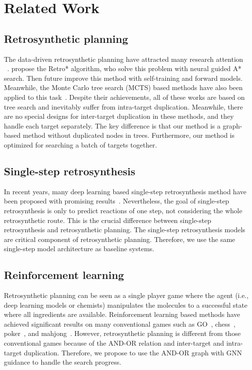 \documentclass[sigconf]{acmart}
\begin{document}
\section{Related Work}
\subsection{Retrosynthetic planning}
The data-driven retrosynthetic planning have attracted many research attention ~\cite{Chen2020,Kim2021,Dong2021,Finnigan2021,Jeong2021,segler2018planning,Schreck2019,Wang2020,Hong2021,han2022gnn}.
\citet{Chen2020} propose the Retro* algorithm, who solve this problem with neural guided A* search.
Then \citet{Kim2021} future improve this method with self-training and forward models.
Meanwhile, the Monte Carlo tree search (MCTS) based methods have also been applied to this task~\citep{segler2018planning,Schreck2019,Wang2020,Hong2021}.
Despite their achievements, all of these works are based on tree search and inevitably suffer from intra-target duplication.
Meanwhile, there are no special designs for inter-target duplication in these methods, and they handle each target separately.
The key difference is that our method is a graph-based method without duplicated nodes in trees.
Furthermore, our method is optimized for searching a batch of targets together.


\subsection{Single-step retrosynthesis}
In recent years, many deep learning based single-step retrosynthesis method have been proposed with promising results~\citep{segler2017towards,dai2020retrosynthesis,Chen2021,yan2020retroxpert,somnath2020learning,shi2020graph,yang2021}.
Nevertheless, the goal of single-step retrosynthesis is only to predict reactions of one step, not considering the whole retrosynthetic route.
This is the crucial difference between single-step retrosynthesis and retrosynthetic planning.
The single-step retrosynthesis models are critical component of retrosynthetic planning.
Therefore, we use the same single-step model architecture as baseline systems.

\subsection{Reinforcement learning}
Retrosynthetic planning can be seen as a single player game where the agent (i.e., deep learning models or chemists) manipulates the molecules to a successful state where all ingredients are available.
Reinforcement learning based methods have achieved significant results on many conventional games such as GO~\citep{silver2017mastering,alphazero}, chess~\citep{alphazero}, poker~\citep{poker2019}, and mahjong~\citep{li2020suphx}.
However, retrosynthetic planning is different from those conventional games because of the AND-OR relation and inter-target and intra-target duplication.
Therefore, we propose to use the AND-OR graph with GNN guidance to handle the search progress.
\end{document}
